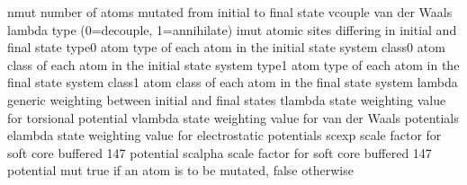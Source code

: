 \documentclass[letterpaper,11pt,english]{sphinxmanual}
\begin{document}

\begin{sphinxVerbatim}[commandchars=\\\{\}]
nmut            number of atoms mutated from initial to final state
vcouple         van der Waals lambda type (0=decouple, 1=annihilate)
imut            atomic sites differing in initial and final state
type0           atom type of each atom in the initial state system
class0          atom class of each atom in the initial state system
type1           atom type of each atom in the final state system
class1          atom class of each atom in the final state system
lambda          generic weighting between initial and final states
tlambda         state weighting value for torsional potential
vlambda         state weighting value for van der Waals potentials
elambda         state weighting value for electrostatic potentials
scexp           scale factor for soft core buffered 14\PYGZhy{}7 potential
scalpha         scale factor for soft core buffered 14\PYGZhy{}7 potential
mut             true if an atom is to be mutated, false otherwise
\end{sphinxVerbatim}

\end{document}
